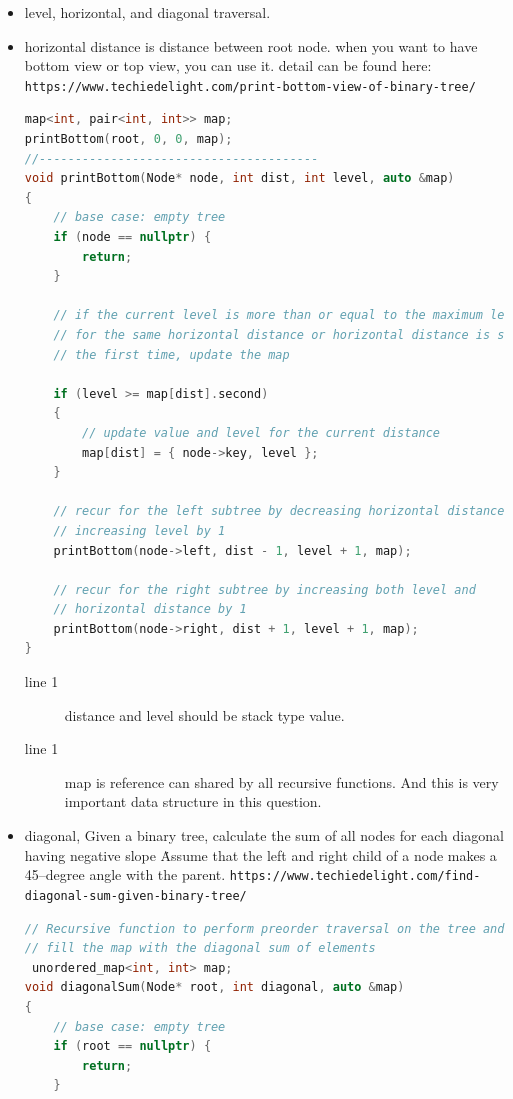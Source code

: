 \documentclass[a4paper,11pt,twoside]{book}
\begin{document}
\begin{itemize}
	\item level, horizontal, and diagonal traversal.
	
	\item horizontal distance is distance between root node.  when you want to have bottom view or top view, you can use it.  detail can be found here: \newline
	\verb|https://www.techiedelight.com/print-bottom-view-of-binary-tree/|
	
\begin{lstlisting}[frame=single, language=c++]
map<int, pair<int, int>> map;
printBottom(root, 0, 0, map);
//---------------------------------------	
void printBottom(Node* node, int dist, int level, auto &map)
{
	// base case: empty tree
	if (node == nullptr) {
		return;
	}
	
	// if the current level is more than or equal to the maximum level seen so far
	// for the same horizontal distance or horizontal distance is seen for
	// the first time, update the map
	
	if (level >= map[dist].second)
	{
		// update value and level for the current distance
		map[dist] = { node->key, level };
	}
	
	// recur for the left subtree by decreasing horizontal distance and
	// increasing level by 1
	printBottom(node->left, dist - 1, level + 1, map);
	
	// recur for the right subtree by increasing both level and
	// horizontal distance by 1
	printBottom(node->right, dist + 1, level + 1, map);
}
\end{lstlisting}
\begin{description}
	\item[line 1] distance and level should be stack type value.
	\item[line 1] map is reference can shared by all recursive functions. And this is very important data structure in this question. 
\end{description}

	\item diagonal, Given a binary tree, calculate the sum of all nodes for each diagonal having negative slope \. Assume that the left and right child of a node makes a 45–degree angle with the parent. \verb|https://www.techiedelight.com/find-diagonal-sum-given-binary-tree/|
\begin{lstlisting}[frame=single, language=c++]
// Recursive function to perform preorder traversal on the tree and
// fill the map with the diagonal sum of elements
 unordered_map<int, int> map;
void diagonalSum(Node* root, int diagonal, auto &map)
{
	// base case: empty tree
	if (root == nullptr) {
		return;
	}
	

\end{lstlisting}
\end{itemize}
\end{document}
